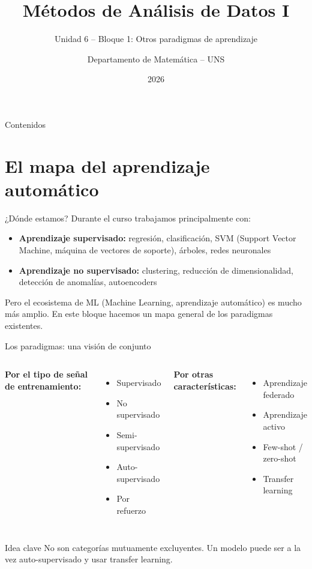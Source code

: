 \documentclass[aspectratio=169]{beamer}
\title[MAD1 -- U6]{Métodos de Análisis de Datos I}
\subtitle{Unidad 6 -- Bloque 1: Otros paradigmas de aprendizaje}
\author{Departamento de Matemática -- UNS}
\date{2026}
\begin{document}
\begin{frame}
  \titlepage
\end{frame}

\begin{frame}{Contenidos}
  \tableofcontents
\end{frame}

\section{El mapa del aprendizaje automático}

\begin{frame}{¿Dónde estamos?}
  Durante el curso trabajamos principalmente con:
  \begin{itemize}
    \item \textbf{Aprendizaje supervisado:} regresión, clasificación, SVM (Support Vector Machine, máquina de vectores de soporte), árboles, redes neuronales
    \item \textbf{Aprendizaje no supervisado:} clustering, reducción de dimensionalidad, detección de anomalías, autoencoders
  \end{itemize}
  \bigskip
  Pero el ecosistema de ML (Machine Learning, aprendizaje automático) es mucho más amplio. En este bloque hacemos un mapa general de los paradigmas existentes.
\end{frame}

\begin{frame}{Los paradigmas: una visión de conjunto}
  \begin{columns}
      \textbf{Por el tipo de señal de entrenamiento:}
      \begin{itemize}
        \item Supervisado
        \item No supervisado
        \item Semi-supervisado
        \item Auto-supervisado
        \item Por refuerzo
      \end{itemize}
      \textbf{Por otras características:}
      \begin{itemize}
        \item Aprendizaje federado
        \item Aprendizaje activo
        \item Few-shot / zero-shot
        \item Transfer learning
      \end{itemize}
  \end{columns}
  \bigskip
  \begin{alertblock}{Idea clave}
    No son categorías mutuamente excluyentes. Un modelo puede ser a la vez auto-supervisado y usar transfer learning.
  \end{alertblock}
\end{frame}
\end{document}
